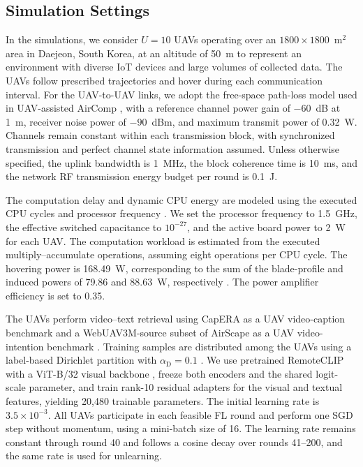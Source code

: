 \subsection{Simulation Settings}
\label{subsec:simulation_settings}

In the simulations, we consider $U=10$ UAVs operating over an
$1800\times1800$~m$^2$ area in Daejeon, South Korea, at an altitude
of 50~m to represent an environment with diverse IoT devices
and large volumes of collected data.
The UAVs follow prescribed trajectories and hover during each
communication interval.
For the UAV-to-UAV links, we adopt the free-space path-loss model
used in UAV-assisted AirComp \cite{Zhai_TWC_2025}, with a reference
channel power gain of $-60$~dB at 1~m, receiver noise power
of $-90$~dBm, and maximum transmit power of 0.32~W.
Channels remain constant within each transmission block,
with synchronized transmission and perfect channel state
information assumed.
Unless otherwise specified, the uplink bandwidth is 1~MHz,
the block coherence time is 10~ms, and the network RF
transmission energy budget per round is 0.1~J.

The computation delay and dynamic CPU energy are modeled
using the executed CPU cycles and processor frequency
\cite{Tang_TWC_2025,Liang_TWC_2025_Energy}.
We set the processor frequency to 1.5~GHz, the effective
switched capacitance to $10^{-27}$, and the active board
power to 2~W for each UAV.
The computation workload is estimated from the executed
multiply--accumulate operations, assuming eight operations
per CPU cycle.
The hovering power is 168.49~W, corresponding to the sum
of the blade-profile and induced powers of 79.86 and
88.63~W, respectively \cite{Wang_TCOMM_2025_Rechargeable}.
The power amplifier efficiency is set to 0.35.

The UAVs perform video--text retrieval using CapERA as a UAV
video-caption benchmark \cite{Bashmal_RS_2023_CapERA} and a
WebUAV3M-source subset of AirScape as a UAV video-intention
benchmark \cite{Zhao_ACMMM_2025_AirScape,Zhang_TPAMI_2023_WebUAV3M}.
Training samples are distributed among the UAVs using a label-based
Dirichlet partition with $\alpha_{\mathrm D}=0.1$
\cite{Mora_TBD_2026,Liang_TWC_2025_Energy}.
We use pretrained RemoteCLIP with a ViT-B/32
visual backbone \cite{Liu_TGRS_2024_RemoteCLIP}, freeze both
encoders and the shared logit-scale parameter, and train rank-10
residual adapters for the visual and textual features,
yielding 20,480 trainable parameters.
The initial learning rate is $3.5\times10^{-3}$.
All UAVs participate in each feasible FL round and perform
one SGD step without momentum, using a mini-batch size of 16.
The learning rate remains constant through round 40 and follows a cosine
decay over rounds 41--200, and the same rate is used for unlearning.

